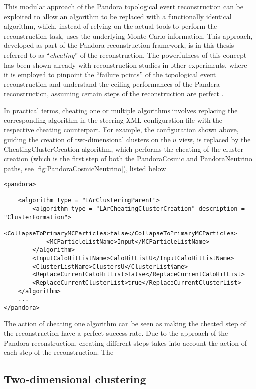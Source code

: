 This modular approach of the Pandora topological event reconstruction can be exploited to allow an algorithm to be replaced with a functionally identical algorithm, which, instead of relying on the actual tools to perform the reconstruction task, uses the underlying Monte Carlo information. This approach, developed as part of the Pandora reconstruction framework, is in this thesis referred to as ``\emph{cheating}'' of the reconstruction. The powerfulness of this concept has been shown already with reconstruction studies in other experiments, where it is employed to pinpoint the ``failure points'' of the topological event reconstruction and understand the ceiling performances of the Pandora reconstruction, assuming certain steps of the reconstruction are perfect \cite{Mawby:2023nws, Mawby:2025_FCCee, Nguyen:2023_cheatingPandora}. 

In practical terms, cheating one or multiple algorithms involves replacing the corresponding algorithm in the steering XML configuration file with the respective cheating counterpart. For example, the configuration shown above, guiding the creation of two-dimensional clusters on the $u$ view, is replaced by the CheatingClusterCreation algorithm, which performs the cheating of the cluster creation (which is the first step of both the PandoraCosmic and PandoraNeutrino paths, see \autoref{fig:PandoraCosmicNeutrino}), listed below 

\begin{lstlisting}[style=xmlstyle]
<pandora>
    ...
    <algorithm type = "LArClusteringParent">
        <algorithm type = "LArCheatingClusterCreation" description = "ClusterFormation">
            <CollapseToPrimaryMCParticles>false</CollapseToPrimaryMCParticles>
            <MCParticleListName>Input</MCParticleListName>
        </algorithm>
        <InputCaloHitListName>CaloHitListU</InputCaloHitListName>
        <ClusterListName>ClustersU</ClusterListName>
        <ReplaceCurrentCaloHitList>false</ReplaceCurrentCaloHitList>
        <ReplaceCurrentClusterList>true</ReplaceCurrentClusterList>
    </algorithm>
    ...
</pandora>
\end{lstlisting}

The action of cheating one algorithm can be seen as making the cheated step of the reconstruction have a perfect success rate. Due to the approach of the Pandora reconstruction, cheating different steps takes into account the action of each step of the reconstruction. The 

\subsection{Two-dimensional clustering}



